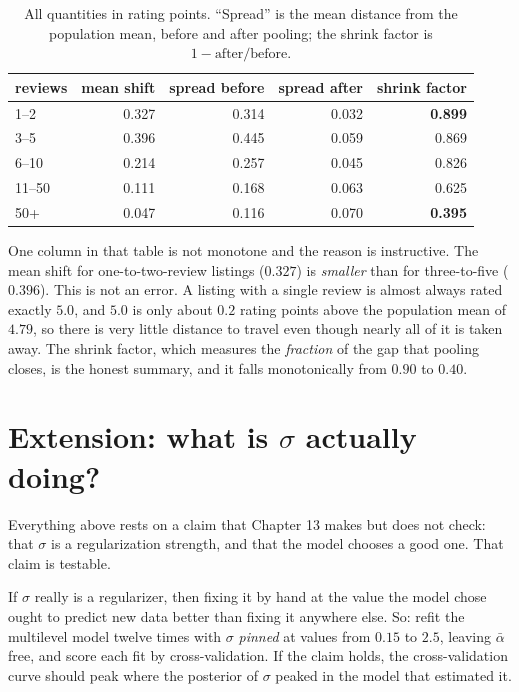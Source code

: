 \documentclass[11pt,a4paper]{article}
\begin{document}
\begin{table}[h!]
\centering
\begin{tabular}{lrrrr}
\toprule
reviews & mean shift & spread before & spread after & \textbf{shrink factor} \\
\midrule
1--2   & 0.327 & 0.314 & 0.032 & \textbf{0.899} \\
3--5   & 0.396 & 0.445 & 0.059 & 0.869 \\
6--10  & 0.214 & 0.257 & 0.045 & 0.826 \\
11--50 & 0.111 & 0.168 & 0.063 & 0.625 \\
50+    & 0.047 & 0.116 & 0.070 & \textbf{0.395} \\
\bottomrule
\end{tabular}
\caption{All quantities in rating points. ``Spread'' is the mean distance from
the population mean, before and after pooling; the shrink factor is
$1 - \text{after}/\text{before}$.}
\end{table}

One column in that table is not monotone and the reason is instructive. The
mean shift for one-to-two-review listings ($0.327$) is \emph{smaller} than for
three-to-five ($0.396$). This is not an error. A listing with a single review is
almost always rated exactly $5.0$, and $5.0$ is only about $0.2$ rating points
above the population mean of $4.79$, so there is very little distance to travel
even though nearly all of it is taken away. The shrink factor, which measures
the \emph{fraction} of the gap that pooling closes, is the honest summary, and
it falls monotonically from $0.90$ to $0.40$.

\section{Extension: what is $\sigma$ actually doing?}

Everything above rests on a claim that Chapter 13 makes but does not check: that
$\sigma$ is a regularization strength, and that the model chooses a good one.
That claim is testable.

If $\sigma$ really is a regularizer, then fixing it by hand at the value the
model chose ought to predict new data better than fixing it anywhere else. So:
refit the multilevel model twelve times with $\sigma$ \emph{pinned} at values
from $0.15$ to $2.5$, leaving $\bar\alpha$ free, and score each fit by
cross-validation. If the claim holds, the cross-validation curve should peak
where the posterior of $\sigma$ peaked in the model that estimated it.
\end{document}
